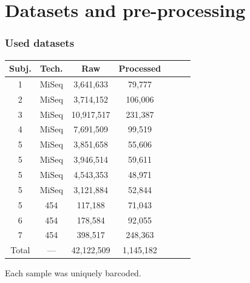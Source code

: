 \documentclass{beamer}\usepackage[]{graphicx}\usepackage[]{color}
\begin{document}
\section{Datasets and pre-processing}
\begin{frame}
    \frametitle{Used datasets}
    { \footnotesize
    \begin{table}[]
    \centering
    \begin{tabular}{ccccccc}
    \hline
    \multicolumn{1}{|c|}{\bf Subj.}   & \multicolumn{1}{c|}{\bf Tech.} & \multicolumn{1}{c|}{\bf Raw }  & \multicolumn{1}{c|}{\bf Processed} \\ \hline
    \multicolumn{1}{|c|}{1}           & \multicolumn{1}{c|}{MiSeq}     & \multicolumn{1}{c|}{3,641,633} & \multicolumn{1}{c|}{79,777   }     \\
    \multicolumn{1}{|c|}{2}           & \multicolumn{1}{c|}{MiSeq}     & \multicolumn{1}{c|}{3,714,152} & \multicolumn{1}{c|}{106,006  }     \\
    \multicolumn{1}{|c|}{3}           & \multicolumn{1}{c|}{MiSeq}     & \multicolumn{1}{c|}{10,917,517}& \multicolumn{1}{c|}{231,387  }     \\
    \multicolumn{1}{|c|}{4}           & \multicolumn{1}{c|}{MiSeq}     & \multicolumn{1}{c|}{7,691,509} & \multicolumn{1}{c|}{99,519   }     \\ \cline{1-4}
    \multicolumn{1}{|c|}{5}           & \multicolumn{1}{c|}{MiSeq}     & \multicolumn{1}{c|}{3,851,658} & \multicolumn{1}{c|}{55,606   }     \\
    \multicolumn{1}{|c|}{5}           & \multicolumn{1}{c|}{MiSeq}     & \multicolumn{1}{c|}{3,946,514} & \multicolumn{1}{c|}{59,611   }     \\
    \multicolumn{1}{|c|}{5}           & \multicolumn{1}{c|}{MiSeq}     & \multicolumn{1}{c|}{4,543,353} & \multicolumn{1}{c|}{48,971   }     \\
    \multicolumn{1}{|c|}{5}           & \multicolumn{1}{c|}{MiSeq}     & \multicolumn{1}{c|}{3,121,884} & \multicolumn{1}{c|}{52,844   }     \\ \cline{1-4}
    \multicolumn{1}{|c|}{5}           & \multicolumn{1}{c|}{454}       & \multicolumn{1}{c|}{117,188}   & \multicolumn{1}{c|}{71,043   }     \\
    \multicolumn{1}{|c|}{6}           & \multicolumn{1}{c|}{454}       & \multicolumn{1}{c|}{178,584}   & \multicolumn{1}{c|}{92,055   }     \\
    \multicolumn{1}{|c|}{7}           & \multicolumn{1}{c|}{454}       & \multicolumn{1}{c|}{398,517}   & \multicolumn{1}{c|}{248,363  }     \\ \hline
    \multicolumn{1}{|c|}{Total}       & \multicolumn{1}{c|}{---}       & \multicolumn{1}{c|}{42,122,509}& \multicolumn{1}{c|}{1,145,182}     \\ \cline{1-4}
    \end{tabular}
    \end{table}
    }

{\color{blue} Each sample was uniquely barcoded.}
\end{frame}
\end{document}
